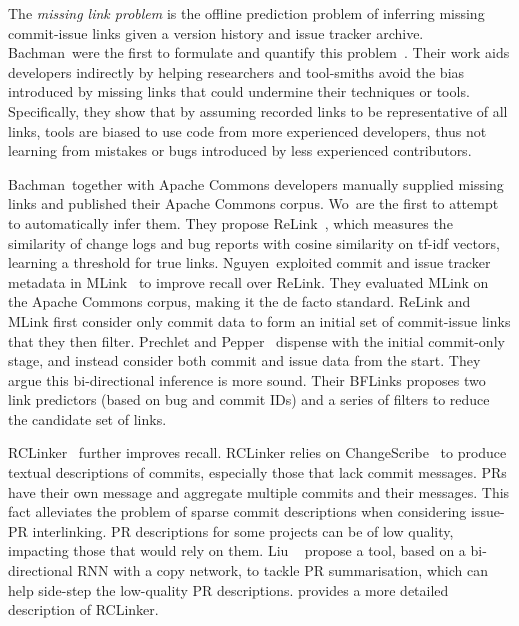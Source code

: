 The \emph{missing link problem} is the offline prediction problem of inferring
missing commit-issue links given a version history and issue tracker archive.
Bachman~\etal were the first to formulate and quantify this
problem~\cite{Bird2009,MissingLinks}. Their work aids developers indirectly by
helping researchers and tool-smiths avoid the bias introduced by missing links
that could undermine their techniques or tools. Specifically, they show that by
assuming recorded links to be representative of all links, tools are biased to
use code from more experienced developers, thus not learning from mistakes or
bugs introduced by less experienced contributors. 

Bachman~\etal together with Apache Commons developers manually supplied missing
links and published their Apache Commons corpus. Wo~\etal are the first to
attempt to automatically infer them. They propose ReLink~\cite{relink}, which
measures the similarity of change logs and bug reports with cosine similarity on
tf-idf vectors, learning a threshold for true links. Nguyen~\etal exploited
commit and issue tracker metadata in MLink~\cite{MLink} to improve recall over
ReLink. They evaluated MLink on the Apache Commons corpus, making it the de
facto standard. ReLink and MLink first consider only commit data to form an
initial set of commit-issue links that they then filter. Prechlet and
Pepper~\cite{prechelt2014bflinks} dispense with the initial commit-only stage,
and instead consider both commit and issue data from the start. They argue this
bi-directional inference is more sound. Their BFLinks proposes two link
predictors (based on bug and commit IDs) and a series of filters to reduce the
candidate set of links.

RCLinker~\cite{RCLinker} further improves recall. RCLinker relies on
ChangeScribe~\cite{ChangeScribe} to produce textual descriptions of commits,
especially those that lack commit messages. PRs have their own message and
aggregate multiple commits and their messages.  
This fact alleviates the problem of sparse commit descriptions when considering
issue-PR interlinking. PR descriptions for some projects can be of low quality,
impacting those that would rely on them. Liu \etal~\cite{liu2019automatic}
propose a tool, based on a bi-directional RNN with a copy network, to tackle PR
summarisation, which can help side-step the low-quality PR descriptions.
 provides a more detailed description of RCLinker.

